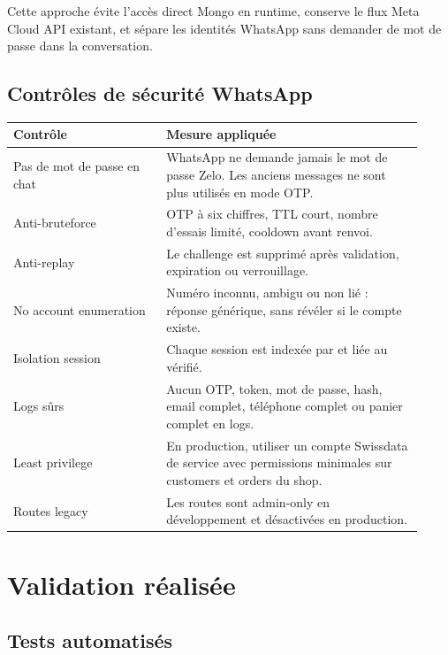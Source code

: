 \documentclass[11pt,a4paper]{article}
\newcommand{\code}[1]{\texttt{\detokenize{#1}}}
\begin{document}
Cette approche évite l'accès direct Mongo en runtime, conserve le flux Meta
Cloud API existant, et sépare les identités WhatsApp sans demander de mot de
passe dans la conversation.

\subsection{Contrôles de sécurité WhatsApp}

\begin{longtable}{p{0.34\linewidth}p{0.58\linewidth}}
\toprule
\textbf{Contrôle} & \textbf{Mesure appliquée} \\
\midrule
Pas de mot de passe en chat & WhatsApp ne demande jamais le mot de passe Zelo. Les anciens messages \code{login ...} ne sont plus utilisés en mode OTP. \\
Anti-bruteforce & OTP à six chiffres, TTL court, nombre d'essais limité, cooldown avant renvoi. \\
Anti-replay & Le challenge est supprimé après validation, expiration ou verrouillage. \\
No account enumeration & Numéro inconnu, ambigu ou non lié : réponse générique, sans révéler si le compte existe. \\
Isolation session & Chaque session est indexée par \code{wa:<numero>} et liée au \code{customerId} vérifié. \\
Logs sûrs & Aucun OTP, token, mot de passe, hash, email complet, téléphone complet ou panier complet en logs. \\
Least privilege & En production, utiliser un compte Swissdata de service avec permissions minimales sur customers et orders du shop. \\
Routes legacy & Les routes \code{/link} sont admin-only en développement et désactivées en production. \\
\bottomrule
\end{longtable}

\section{Validation réalisée}

\subsection{Tests automatisés}
\end{document}
